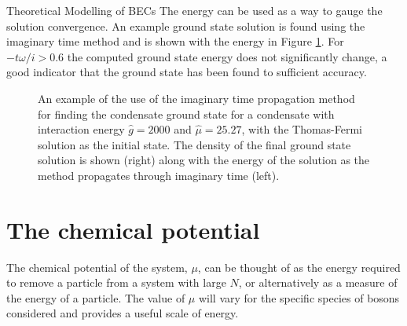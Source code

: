 \begin{chapter}{\label{cha:theoretical_model}Theoretical Modelling of BECs}
The energy can be used as a way to gauge the solution convergence. An example ground state solution is found using the imaginary time method and is shown with the energy in Figure \ref{fig_imagtimesolgs}. For $-t\omega/i > 0.6$ the computed ground state energy does not significantly change, a good indicator that the ground state has been found to sufficient accuracy.
\begin{figure}[!ht]
	\centering
  \hspace{0.04\linewidth}
	\caption{An example of the use of the imaginary time propagation method for finding the condensate ground state for a condensate with interaction energy $\hat{g}=2000$ and $\hat{\mu}=25.27$, with the Thomas-Fermi solution as the initial state. The density of the final ground state solution is shown (right) along with the energy of the solution as the method propagates through imaginary time (left).}\label{fig_imagtimesolgs}
\end{figure}

\section{\label{section:mu} The chemical potential}
The chemical potential of the system, $\mu$, can be thought of as the energy required to remove a particle from a system with large $N$, or alternatively as a measure of the energy of a particle. The value of $\mu$ will vary for the specific species of bosons considered and provides a useful scale of energy.


\end{chapter}
